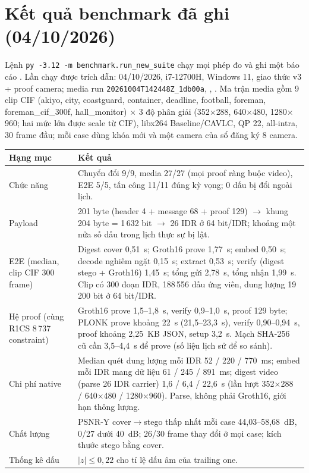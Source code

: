 \documentclass[10pt,a4paper]{article}
\begin{document}
\section{Kết quả benchmark đã ghi (04/10/2026)}\label{sec:bench}

Lệnh \texttt{py -3.12 -m benchmark.run\_new\_suite} chạy mọi phép đo và ghi một báo cáo . Lần chạy được trích dẫn: 04/10/2026, i7-12700H, Windows 11, giao thức v3 + proof camera; media run \texttt{20261004T142448Z\_1db00a}, , . Ma trận media gồm 9 clip CIF (akiyo, city, coastguard, container, deadline, football, foreman, foreman\_cif\_300f, hall\_monitor) $\times$ 3 độ phân giải (352$\times$288, 640$\times$480, 1280$\times$960; hai mức lớn được scale từ CIF), libx264 Baseline/CAVLC, QP 22, all-intra, 30 frame đầu; mỗi case dùng khóa mới và một camera của sổ đăng ký 8 camera.

\begin{longtable}{@{}p{.30\linewidth}p{.64\linewidth}@{}}
\toprule
\textbf{Hạng mục} & \textbf{Kết quả}\tabularnewline
\midrule\endhead
Chức năng & Chuyển đổi 9/9, media 27/27 (mọi proof ràng buộc video), E2E 5/5, tấn công 11/11 đúng kỳ vọng; 0 dấu bị đổi ngoài lịch.\\
Payload & 201 byte (header 4 + message 68 + proof 129) $\rightarrow$ khung 204 byte = 1\,632 bit $\rightarrow$ 26 IDR ở 64 bit/IDR; khoảng một nửa số dấu trong lịch thực sự bị lật.\\
E2E (median, clip CIF 300 frame) & Digest cover 0,51~s; Groth16 prove 1,77~s; embed 0,50~s; decode nghiêm ngặt 0,15~s; extract 0,53~s; verify (digest stego + Groth16) 1,45~s; tổng gửi 2,78~s, tổng nhận 1,99~s. Clip có 300 đoạn IDR, 188\,556 dấu ứng viên, dung lượng 19\,200 bit ở 64 bit/IDR.\\
Hệ proof (cùng R1CS 8\,737 constraint) & Groth16 prove 1,5--1,8~s, verify 0,9--1,0~s, proof 129 byte; PLONK prove khoảng 22~s (21,5--23,3~s), verify 0,90--0,94~s, proof khoảng 2,25~KB JSON, setup 3,2~s. Mạch SHA-256 cũ cần 3,5--4,4~s để prove (số liệu lịch sử để so sánh).\\
Chi phí native & Median quét dung lượng mỗi IDR 52 / 220 / 770~ms; embed mỗi IDR mang dữ liệu 61 / 245 / 891~ms; digest video (parse 26 IDR carrier) 1,6 / 6,4 / 22,6~s (lần lượt 352$\times$288 / 640$\times$480 / 1280$\times$960). Parse, không phải Groth16, giới hạn thông lượng.\\
Chất lượng & PSNR-Y cover$\rightarrow$stego thấp nhất mỗi case 44,03--58,68~dB, 0/27 dưới 40~dB; 26/30 frame thay đổi ở mọi case; kích thước stego bằng cover.\\
Thống kê dấu & $|z|\leq 0{,}22$ cho tỉ lệ dấu âm của trailing one.\\
\bottomrule
\end{longtable}
\end{document}
